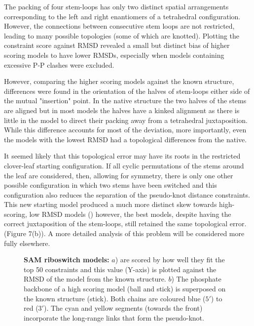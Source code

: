 The packing of four stem-loops has only two distinct spatial arrangements corresponding to
the left and right enantiomers of a tetrahedral configuration.   However, the connections 
between consecutive stem loops are not restricted, leading to many possible topologies
(some of which are knotted).   Plotting the constraint score against RMSD revealed a
small but distinct bias of higher scoring models to have lower RMSDs, especially when
models containing excessive P-P clashes were excluded.

However, comparing the higher scoring models against the known structure, differences
were found in the orientation of the halves of stem-loops either side of the mutual
"insertion" point.  In the native structure the two halves of the stems are aligned but
in most models the halves have a kinked alignment as there is little in the model to
direct their packing away from a tetrahedral juxtaposition.   While this difference
accounts for most of the deviation, more importantly, even the models with the lowest 
RMSD had a topological differences from the native.     

It seemed likely that this topological error may have its roots in the restricted
clover-leaf starting configuration.   If all cyclic permutations of the stems around the
leaf are considered, then, allowing for symmetry, there is only one other possible
configuration in which two stems have been switched and this configuration
also reduces the separation of the pseudo-knot distance constraints.  This new starting
model produced a much more distinct skew towards high-scoring, low RMSD models
() however, the best models, despite having the correct juxtaposition
of the stem-loops, still retained the same topological error.  (Figure 7(b)).
A more detailed analysis of this problem will be considered more fully elsewhere.

\begin{figure}
\centering
{}
\caption{
\label{Fig:ribo}
{\bf SAM riboswitch models:} $a$) are scored by how well they fit the top 50 constraints
and this value (Y-axis) is plotted against the RMSD of the model from the known structure.
$b$) The phosphate backbone of a high scoring model (ball and stick) is superposed on the 
known structure (stick).  Both chains are coloured blue ($5'$) to red ($3'$).
The cyan and yellow segments (towards the front) incorporate the long-range links that
form the pseudo-knot.
}
\end{figure}
